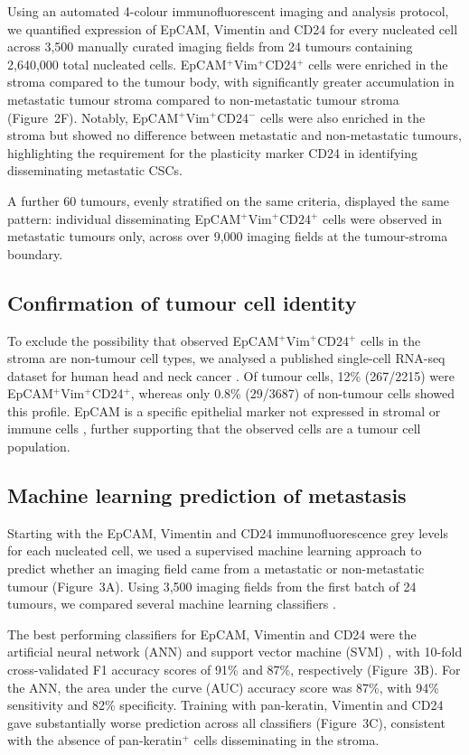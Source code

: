 \documentclass[11pt]{article}
\begin{document}
Using an automated 4-colour immunofluorescent imaging and analysis protocol, we quantified expression of EpCAM, Vimentin and CD24 for every nucleated cell across 3,500 manually curated imaging fields from 24 tumours containing 2,640,000 total nucleated cells. EpCAM$^+$Vim$^+$CD24$^+$ cells were enriched in the stroma compared to the tumour body, with significantly greater accumulation in metastatic tumour stroma compared to non-metastatic tumour stroma (Figure~2F). Notably, EpCAM$^+$Vim$^+$CD24$^-$ cells were also enriched in the stroma but showed no difference between metastatic and non-metastatic tumours, highlighting the requirement for the plasticity marker CD24 in identifying disseminating metastatic CSCs.

A further 60 tumours, evenly stratified on the same criteria, displayed the same pattern: individual disseminating EpCAM$^+$Vim$^+$CD24$^+$ cells were observed in metastatic tumours only, across over 9,000 imaging fields at the tumour-stroma boundary.

\subsection{Confirmation of tumour cell identity}

To exclude the possibility that observed EpCAM$^+$Vim$^+$CD24$^+$ cells in the stroma are non-tumour cell types, we analysed a published single-cell RNA-seq dataset for human head and neck cancer \citep{puram2017}. Of tumour cells, 12\% (267/2215) were EpCAM$^+$Vim$^+$CD24$^+$, whereas only 0.8\% (29/3687) of non-tumour cells showed this profile. EpCAM is a specific epithelial marker not expressed in stromal or immune cells \citep{keller2019}, further supporting that the observed cells are a tumour cell population.

\subsection{Machine learning prediction of metastasis}

Starting with the EpCAM, Vimentin and CD24 immunofluorescence grey levels for each nucleated cell, we used a supervised machine learning approach to predict whether an imaging field came from a metastatic or non-metastatic tumour (Figure~3A). Using 3,500 imaging fields from the first batch of 24 tumours, we compared several machine learning classifiers \citep{pedregosa2011}.

The best performing classifiers for EpCAM, Vimentin and CD24 were the artificial neural network (ANN) \citep{rumelhart1986} and support vector machine (SVM) \citep{smola2004}, with 10-fold cross-validated F1 accuracy scores of 91\% and 87\%, respectively (Figure~3B). For the ANN, the area under the curve (AUC) accuracy score was 87\%, with 94\% sensitivity and 82\% specificity. Training with pan-keratin, Vimentin and CD24 gave substantially worse prediction across all classifiers (Figure~3C), consistent with the absence of pan-keratin$^+$ cells disseminating in the stroma.
\end{document}
